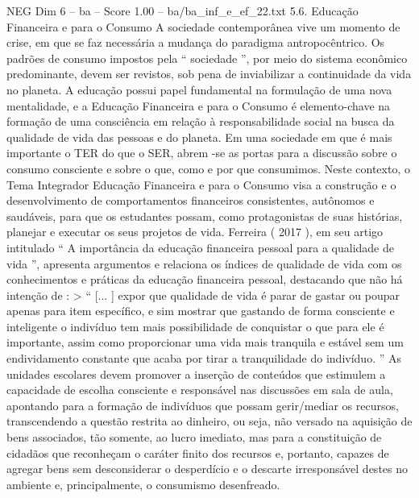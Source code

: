 \begin{textsample}{NEG Dim 6 – ba – Score 1.00 – ba/ba\_inf\_e\_ef\_22.txt}  \label{ex:f6_neg_211}
5.6.
Educação Financeira e para o Consumo A sociedade contemporânea vive um momento de crise, em que se faz necessária a mudança do paradigma antropocêntrico.
Os padrões de consumo impostos pela “ sociedade ”, por meio do sistema econômico predominante, devem ser revistos, sob pena de inviabilizar a continuidade da vida no planeta.
A educação possui papel fundamental na formulação de uma nova mentalidade, e a Educação Financeira e para o Consumo é elemento-chave na formação de uma consciência em relação à responsabilidade social na busca da qualidade de vida das pessoas e do planeta.
Em uma sociedade em que é mais importante o TER do que o SER, abrem -se as portas para a discussão sobre o consumo consciente e sobre o que, como e por que consumimos.
Neste contexto, o Tema Integrador Educação Financeira e para o Consumo visa a construção e o desenvolvimento de comportamentos financeiros consistentes, autônomos e saudáveis, para que os estudantes possam, como protagonistas de suas histórias, planejar e executar os seus projetos de vida.
Ferreira ( 2017 ), em seu artigo intitulado “ A importância da educação financeira pessoal para a qualidade de vida ”, apresenta argumentos e relaciona os índices de qualidade de vida com os conhecimentos e práticas da educação financeira pessoal, destacando que não há intenção de : > “ [... ] expor que qualidade de vida é parar de gastar ou poupar apenas para item específico, e sim mostrar que gastando de forma consciente e inteligente o indivíduo tem mais possibilidade de conquistar o que para ele é importante, assim como proporcionar uma vida mais tranquila e estável sem um endividamento constante que acaba por tirar a tranquilidade do indivíduo. ” As unidades escolares devem promover a inserção de conteúdos que estimulem a capacidade de escolha consciente e responsável nas discussões em sala de aula, apontando para a formação de indivíduos que possam gerir/mediar os recursos, transcendendo a questão restrita ao dinheiro, ou seja, não versado na aquisição de bens associados, tão somente, ao lucro imediato, mas para a constituição de cidadãos que reconheçam o caráter finito dos recursos e, portanto, capazes de agregar bens sem desconsiderar o desperdício e o descarte irresponsável destes no ambiente e, principalmente, o consumismo desenfreado.

\end{textsample}
